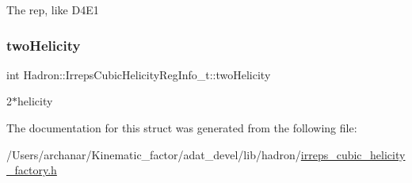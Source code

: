 The rep, like D4\+E1 \mbox{\label{structHadron_1_1IrrepsCubicHelicityRegInfo__t_a56f2014e4c57b36a5da63b9be44f1f0a}} 
\subsubsection{\texorpdfstring{twoHelicity}{twoHelicity}}
{\footnotesize\ttfamily int Hadron\+::\+Irreps\+Cubic\+Helicity\+Reg\+Info\+\_\+t\+::two\+Helicity}

2$\ast$helicity 

The documentation for this struct was generated from the following file\+:\begin{DoxyCompactItemize}
\item 
/\+Users/archanar/\+Kinematic\+\_\+factor/adat\+\_\+devel/lib/hadron/\mbox{\hyperlink{lib_2hadron_2irreps__cubic__helicity__factory_8h}{irreps\+\_\+cubic\+\_\+helicity\+\_\+factory.\+h}}\end{DoxyCompactItemize}
